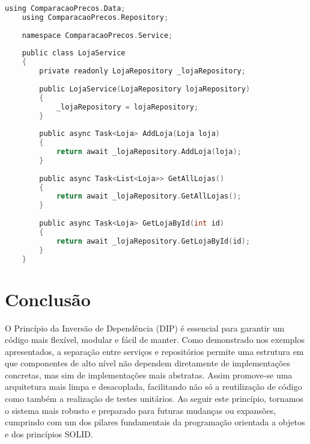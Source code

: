 \documentclass[12pt]{article}
\begin{document}
\begin{lstlisting}[language=C,caption={LojaService.cs}]
    using ComparacaoPrecos.Data;
    using ComparacaoPrecos.Repository;
    
    namespace ComparacaoPrecos.Service;
    
    public class LojaService
    {
        private readonly LojaRepository _lojaRepository;
    
        public LojaService(LojaRepository lojaRepository)
        {
            _lojaRepository = lojaRepository;
        }
    
        public async Task<Loja> AddLoja(Loja loja)
        {
            return await _lojaRepository.AddLoja(loja);
        }
    
        public async Task<List<Loja>> GetAllLojas()
        {
            return await _lojaRepository.GetAllLojas();
        }
    
        public async Task<Loja> GetLojaById(int id)
        {
            return await _lojaRepository.GetLojaById(id);
        }
    }
\end{lstlisting}

\vspace{0.5cm}

\section*{Conclusão}

O Princípio da Inversão de Dependência (DIP) é essencial para garantir
 um código mais flexível, modular e fácil de manter. Como demonstrado 
 nos exemplos apresentados, a separação entre serviços e repositórios permite
 uma estrutura em que componentes de alto nível não dependem diretamente de 
 implementações concretas, mas sim de implementações mais abstratas. Assim promove-se uma arquitetura
 mais limpa e desacoplada, facilitando não só a reutilização de código 
 como também a realização de testes unitários. Ao seguir este princípio,
tornamos o sistema mais robusto e preparado para futuras mudanças ou expansões,
cumprindo com um dos pilares fundamentais da programação orientada a objetos 
e dos princípios SOLID.
\end{document}
